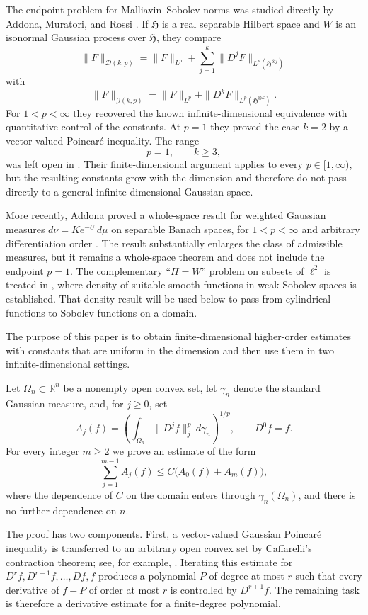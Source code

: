 \documentclass[12pt]{article}
\theoremstyle{plain}
\theoremstyle{definition}
\theoremstyle{remark}
\numberwithin{equation}{section}
\newcommand{\rr}{\mathbb{R}}
\begin{document}
The endpoint problem for Malliavin--Sobolev norms was studied directly by Addona, Muratori, and Rossi \cite{AddonaMuratoriRossi}.  If $\mathfrak H$ is a real separable Hilbert space and $W$ is an isonormal Gaussian process over $\mathfrak H$, they compare
\[
\|F\|_{\mathcal D(k,p)}
=
\|F\|_{L^p}
+
\sum_{j=1}^{k}
\|D^jF\|_{L^p(\mathfrak H^{\otimes j})}
\]
with
\[
\|F\|_{\mathcal G(k,p)}
=
\|F\|_{L^p}
+
\|D^kF\|_{L^p(\mathfrak H^{\otimes k})}.
\]
For $1<p<\infty$ they recovered the known infinite-dimensional equivalence with quantitative control of the constants.  At $p=1$ they proved the case $k=2$ by a vector-valued Poincar\'e inequality.  The range
\[
p=1,\qquad k\geqslant3,
\]
was left open in \cite{AddonaMuratoriRossi}.  Their finite-dimensional argument applies to every $p\in[1,\infty)$, but the resulting constants grow with the dimension and therefore do not pass directly to a general infinite-dimensional Gaussian space.

More recently, Addona proved a whole-space result for weighted Gaussian measures $d\nu=K e^{-U}\,d\mu$ on separable Banach spaces, for $1<p<\infty$ and arbitrary differentiation order \cite{AddonaWeighted2025}.  The result substantially enlarges the class of admissible measures, but it remains a whole-space theorem and does not include the endpoint $p=1$.  The complementary ``$H=W$'' problem on subsets of $\ell^2$ is treated in \cite{WYZZ}, where density of suitable smooth functions in weak Sobolev spaces is established.  That density result will be used below to pass from cylindrical functions to Sobolev functions on a domain.

The purpose of this paper is to obtain finite-dimensional higher-order estimates with constants that are uniform in the dimension and then use them in two infinite-dimensional settings.

Let $\Omega_n\subset\rr^n$ be a nonempty open convex set, let $\gamma_n$ denote the standard Gaussian measure, and, for $j\geqslant0$, set
\[
A_j(f)
=
\left(
\int_{\Omega_n}\|D^jf\|_j^p\,d\gamma_n
\right)^{1/p},
\qquad D^0f=f.
\]
For every integer $m\geqslant2$ we prove an estimate of the form
\[
\sum_{j=1}^{m-1}A_j(f)
\leqslant
C\bigl(A_0(f)+A_m(f)\bigr),
\]
where the dependence of $C$ on the domain enters through $\gamma_n(\Omega_n)$, and there is no further dependence on $n$.

The proof has two components.  First, a vector-valued Gaussian Poincar\'e inequality is transferred to an arbitrary open convex set by Caffarelli's contraction theorem; see, for example, \cite{GozlanJuillet}.  Iterating this estimate for $D^rf,D^{r-1}f,\ldots,Df,f$ produces a polynomial $P$ of degree at most $r$ such that every derivative of $f-P$ of order at most $r$ is controlled by $D^{r+1}f$.  The remaining task is therefore a derivative estimate for a finite-degree polynomial.
\end{document}
